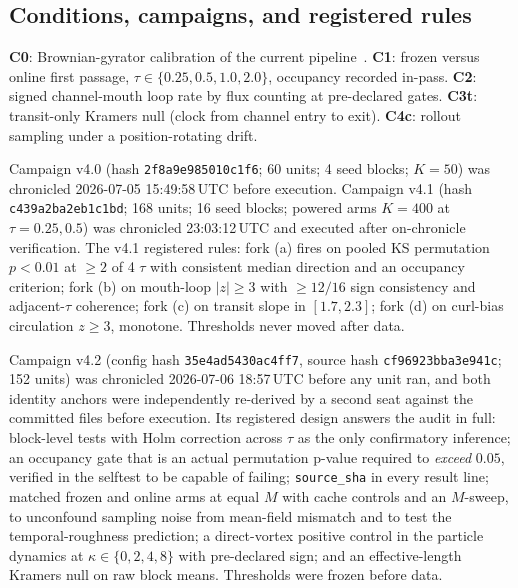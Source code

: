\documentclass[11pt]{article}
\begin{document}
\subsection{Conditions, campaigns, and registered rules}
\textbf{C0}: Brownian-gyrator calibration of the current pipeline~\cite{filliger}. \textbf{C1}: frozen versus online first passage, $\tau \in \{0.25, 0.5, 1.0, 2.0\}$, occupancy recorded in-pass. \textbf{C2}: signed channel-mouth loop rate by flux counting at pre-declared gates. \textbf{C3t}: transit-only Kramers null (clock from channel entry to exit). \textbf{C4c}: rollout sampling under a position-rotating drift.

Campaign v4.0 (hash \texttt{2f8a9e985010c1f6}; 60 units; 4 seed blocks; $K{=}50$) was chronicled 2026-07-05 15:49:58\,UTC before execution. Campaign v4.1 (hash \texttt{c439a2ba2eb1c1bd}; 168 units; 16 seed blocks; powered arms $K{=}400$ at $\tau{=}0.25, 0.5$) was chronicled 23:03:12\,UTC and executed after on-chronicle verification. The v4.1 registered rules: fork (a) fires on pooled KS permutation $p<0.01$ at $\ge2$ of 4 $\tau$ with consistent median direction and an occupancy criterion; fork (b) on mouth-loop $|z|\ge3$ with $\ge12/16$ sign consistency and adjacent-$\tau$ coherence; fork (c) on transit slope in $[1.7,2.3]$; fork (d) on curl-bias circulation $z\ge3$, monotone. Thresholds never moved after data.

Campaign v4.2 (config hash \texttt{35e4ad5430ac4ff7}, source hash \texttt{cf96923bba3e941c}; 152 units) was chronicled 2026-07-06 18:57\,UTC before any unit ran, and both identity anchors were independently re-derived by a second seat against the committed files before execution. Its registered design answers the audit in full: block-level tests with Holm correction across $\tau$ as the only confirmatory inference; an occupancy gate that is an actual permutation p-value required to \emph{exceed} $0.05$, verified in the selftest to be capable of failing; \texttt{source\_sha} in every result line; matched frozen and online arms at equal $M$ with cache controls and an $M$-sweep, to unconfound sampling noise from mean-field mismatch and to test the temporal-roughness prediction; a direct-vortex positive control in the particle dynamics at $\kappa \in \{0,2,4,8\}$ with pre-declared sign; and an effective-length Kramers null on raw block means. Thresholds were frozen before data.
\end{document}
